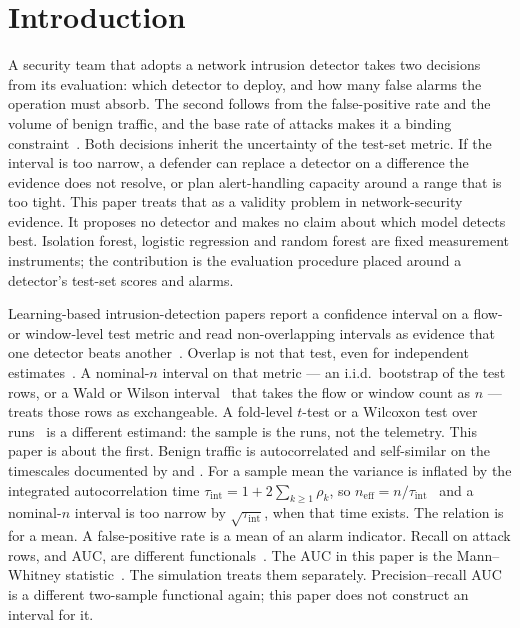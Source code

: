 \documentclass[a4paper,fleqn]{cas-dc}
\newcommand{\neff}{n_{\mathrm{eff}}}
\begin{document}
\maketitle

\section{Introduction}
A security team that adopts a network intrusion detector takes two decisions from its evaluation:
which detector to deploy, and how many false alarms the operation must absorb. The second follows
from the false-positive rate and the volume of benign traffic, and the base rate of attacks makes it
a binding constraint~\citep{axelsson2000baserate}. Both decisions inherit the uncertainty of the
test-set metric. If the interval is too narrow, a defender can replace a detector on a difference
the evidence does not resolve, or plan alert-handling capacity around a range that is too tight.
This paper treats that as a validity problem in network-security evidence. It proposes no detector
and makes no claim about which model detects best. Isolation forest, logistic regression and random
forest are fixed measurement instruments; the contribution is the evaluation procedure placed
around a detector's test-set scores and alarms.

Learning-based intrusion-detection papers report a confidence interval on a flow- or window-level
test metric and read non-overlapping intervals as evidence that one detector beats
another~\citep{arp2022dos,lew2026deployment}. Overlap is not that test, even for independent
estimates~\citep{schenker2001overlap}. A
nominal-$n$ interval on that metric --- an i.i.d.\ bootstrap of the test rows, or a Wald or Wilson
interval~\citep{wilson1927probable,brown2001interval,mcgrath2024binomial} that takes the flow or window count as $n$ ---
treats those rows as exchangeable. A fold-level $t$-test or a Wilcoxon test over
runs~\citep{wilcoxon1945individual} is a different estimand: the sample is the runs,
not the telemetry. This paper is about the first. Benign traffic is autocorrelated and
self-similar on the timescales documented by \citet{paxson1995failure} and \citet{leland1994self}.
For a sample mean
the variance is inflated by the integrated autocorrelation time
$\tau_{\mathrm{int}} = 1 + 2\sum_{k\ge 1}\rho_k$, so
$\neff = n/\tau_{\mathrm{int}}$~\citep{geyer1992practical,vehtari2021ess} and a nominal-$n$ interval is too narrow
by $\sqrt{\tau_{\mathrm{int}}}$, when that time exists. The relation is for a mean. A false-positive
rate is a mean of an alarm indicator. Recall on attack rows, and AUC, are different
functionals~\citep{fawcett2006roc}. The AUC in this paper is the Mann--Whitney
statistic~\citep{mann1947test,hanley1982meaning}.
The simulation treats them separately. Precision--recall AUC is a different two-sample functional
again; this paper does not construct an interval for it.
\end{document}
